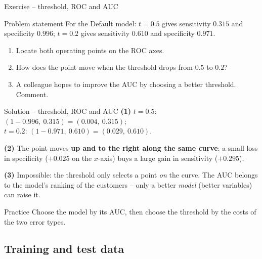 \documentclass[aspectratio=169,11pt]{beamer}
\begin{document}
\begin{frame}{Exercise -- threshold, ROC and AUC}
  \begin{block}{Problem statement}
    For the Default model: $t=0.5$ gives sensitivity $0.315$ and
    specificity $0.996$; $t=0.2$ gives sensitivity $0.610$ and specificity
    $0.971$.
    \begin{enumerate}
      \item Locate both operating points on the ROC axes.
      \item How does the point move when the threshold drops from $0.5$ to
            $0.2$?
      \item A colleague hopes to improve the AUC by choosing a better
            threshold. Comment.
    \end{enumerate}
  \end{block}
\end{frame}

\begin{frame}{Solution -- threshold, ROC and AUC}
  \textbf{(1)} $t=0.5$: $(1-0.996,\ 0.315)=(0.004,\ 0.315)$;\\
   $t=0.2$: $(1-0.971,\ 0.610)=(0.029,\ 0.610)$.

  \medskip
  \textbf{(2)} The point moves \textbf{up and to the right along the same
  curve}: a small loss in specificity ($+0.025$ on the $x$-axis) buys a
  large gain in sensitivity ($+0.295$).

  \medskip
  \textbf{(3)} Impossible: the threshold only selects a point \emph{on} the
  curve. The AUC belongs to the model's ranking of the customers -- only a
  better \emph{model} (better variables) can raise it.
  \begin{exampleblock}{Practice}
    Choose the model by its AUC, then choose the threshold by the costs of
    the two error types.
  \end{exampleblock}
\end{frame}

\subsection{Training and test data}
\end{document}
